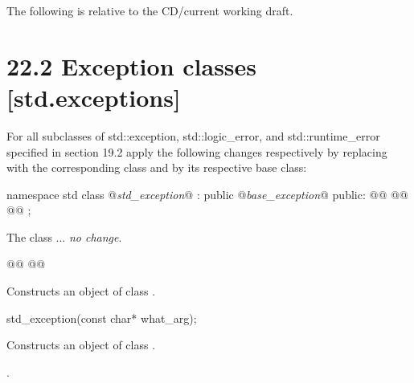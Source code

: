 \documentclass[ebook,11pt,article]{memoir}
\begin{document}
The following is relative to the CD/current working draft.

\section{22.2 {Exception classes} [std.exceptions]}
For all subclasses of std::exception, std::logic_error, and std::runtime_error specified in section 19.2 apply the following changes respectively by replacing \emph{} with the corresponding class and \emph{} by its respective base class:


\begin{codeblock}
namespace std {
  class @\emph{std_exception}@ : public @\emph{base_exception}@ {
  public:
    @@
    @@
    @@
  };
}
\end{codeblock}

\pnum
The class
\emph{} ... \emph{no change}.

\begin{itemdecl}
@@
@@
\end{itemdecl}

\begin{itemdescr}
\pnum
\effects
Constructs an object of class
\emph{}.

\pnum
\postconditions
{}
\end{itemdescr}

\begin{removedblock}
\begin{itemdecl}
std_exception(const char* what_arg);
\end{itemdecl}

\begin{itemdescr}
\pnum
\effects
Constructs an object of class
.

\pnum
\postconditions
{}.
\end{itemdescr}
\end{removedblock}
\end{document}
